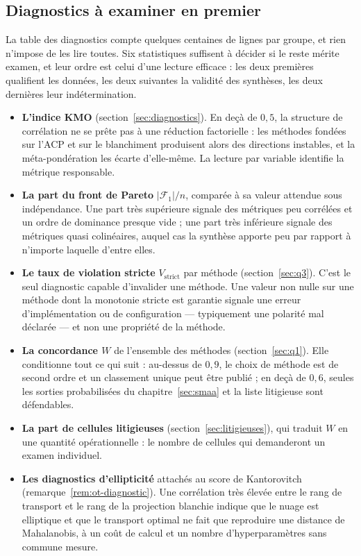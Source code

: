 \documentclass[11pt,a4paper]{article}
\theoremstyle{definition}
\theoremstyle{remark}
\newcommand{\abs}[1]{\left\lvert #1 \right\rvert}
\begin{document}
\bigskip

\subsection{Diagnostics à examiner en premier}
\label{sec:app-diagnostics}

\medskip

La table des diagnostics compte quelques centaines de lignes par groupe, et rien n'impose de
les lire toutes. Six statistiques suffisent à décider si le reste mérite examen, et leur
ordre est celui d'une lecture efficace : les deux premières qualifient les données, les deux
suivantes la validité des synthèses, les deux dernières leur indétermination.

\medskip

\begin{itemize}[leftmargin=1.4em,itemsep=3pt]
  \item \textbf{L'indice KMO} (section~\ref{sec:diagnostics}). En deçà de $0{,}5$, la
  structure de corrélation ne se prête pas à une réduction factorielle : les méthodes
  fondées sur l'ACP et sur le blanchiment produisent alors des directions instables, et la
  méta-pondération les écarte d'elle-même. La lecture par variable identifie la métrique
  responsable.
  \item \textbf{La part du front de Pareto} $\abs{\mathcal{F}_1}/n$, comparée à sa valeur
  attendue sous indépendance. Une part très supérieure signale des métriques peu corrélées
  et un ordre de dominance presque vide ; une part très inférieure signale des métriques
  quasi colinéaires, auquel cas la synthèse apporte peu par rapport à n'importe laquelle
  d'entre elles.
  \item \textbf{Le taux de violation stricte} $V_{\mathrm{strict}}$ par méthode
  (section~\ref{sec:q3}). C'est le seul diagnostic capable d'invalider une méthode. Une
  valeur non nulle sur une méthode dont la monotonie stricte est garantie signale une erreur
  d'implémentation ou de configuration --- typiquement une polarité mal déclarée --- et non
  une propriété de la méthode.
  \item \textbf{La concordance $W$} de l'ensemble des méthodes (section~\ref{sec:q1}). Elle
  conditionne tout ce qui suit : au-dessus de $0{,}9$, le choix de méthode est de second
  ordre et un classement unique peut être publié ; en deçà de $0{,}6$, seules les sorties
  probabilisées du chapitre~\ref{sec:smaa} et la liste litigieuse sont défendables.
  \item \textbf{La part de cellules litigieuses} (section~\ref{sec:litigieuses}), qui
  traduit $W$ en une quantité opérationnelle : le nombre de cellules qui demanderont un
  examen individuel.
  \item \textbf{Les diagnostics d'ellipticité} attachés au score de Kantorovitch
  (remarque~\ref{rem:ot-diagnostic}). Une corrélation très élevée entre le rang de transport
  et le rang de la projection blanchie indique que le nuage est elliptique et que le
  transport optimal ne fait que reproduire une distance de Mahalanobis, à un coût de calcul
  et un nombre d'hyperparamètres sans commune mesure.
\end{itemize}
\end{document}
